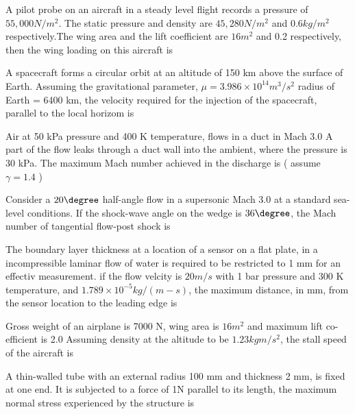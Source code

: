 \iffalse
\title{GATE Questions 13}
\author{EE24BTECH11012 - Bhavanisankar G S}
\section{ae}
\chapter{2018}
\fi
	\item A pilot probe on an aircraft in a steady level flight records a pressure of $55,000 N/m^2$. The static pressure and density are $45,280 N/m^2$ and $0.6 kg/m^2$ respectively.The wing area and the lift coefficient are $16 m^2$ and 0.2 respectively, then the wing loading on this aircraft is
	\item A spacecraft forms a circular orbit at an altitude of 150 km above the surface of Earth. Assuming the gravitational parameter, $\mu = 3.986 \times 10^{14} m^3/s^2$ radius of Earth = 6400 km, the velocity required for the injection of the spacecraft, parallel to the local horizom is
	\item Air at 50 kPa pressure and 400 K temperature, flows in a duct in Mach 3.0 A part of the flow leaks through a duct wall into the ambient, where the pressure is 30 kPa. The maximum Mach number achieved in the discharge is ( assume $\gamma = 1.4$ )
	\item Consider a $20 \degree$ half-angle flow in a supersonic Mach 3.0 at a standard sea-level conditions. If the shock-wave angle on the wedge is $36 \degree$, the Mach number of tangential flow-post shock is
	\item The boundary layer thickness at a location of a sensor on a flat plate, in a incompressible laminar flow of water is required to be restricted to 1 mm for an effectiv measurement. if the flow velcity is $20 m/s$ with 1 bar pressure and 300 K temperature, and $1.789 \times 10^{-5} kg/(m-s)$, the maximum distance, in mm, from the sensor location to the leading edge is
	\item Gross weight of an airplane is 7000 N, wing area is $16 m^2$ and maximum lift co-efficient is 2.0 Assuming density at the altitude to be $1.23 kgm/s^2$, the stall speed of the aircraft is
	\item A thin-walled tube with an external radius 100 mm and thickness 2 mm, is fixed at one end. It is subjected to a force of 1N parallel to its length, the maximum normal stress experienced by the structure is
